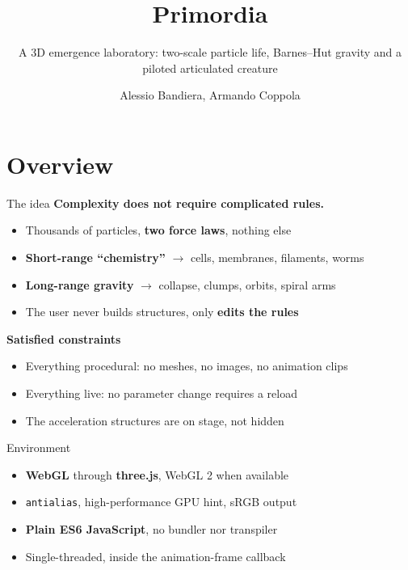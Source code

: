 \documentclass[10pt]{beamer}
\title{Primordia}
\subtitle{A 3D emergence laboratory: two-scale particle life, Barnes--Hut gravity
          and a piloted articulated creature}
\author{Alessio Bandiera, Armando Coppola}
\begin{document}
\maketitle

\section{Overview}

\begin{frame}{The idea}
	\textbf{Complexity does not require complicated rules.}
	\begin{itemize}
		\item Thousands of particles, \textbf{two force laws}, nothing else
		\item \textbf{Short-range ``chemistry''} $\to$ cells, membranes, filaments, worms
		\item \textbf{Long-range gravity} $\to$ collapse, clumps, orbits, spiral arms
		\item The user never builds structures, only \textbf{edits the rules}
	\end{itemize}
	\vspace{1ex}
	\textbf{Satisfied constraints}
	\begin{itemize}
		\item Everything procedural: no meshes, no images, no animation clips
		\item Everything live: no parameter change requires a reload
		\item The acceleration structures are on stage, not hidden
	\end{itemize}
\end{frame}

\begin{frame}{Environment}
	\begin{itemize}
		\item \textbf{WebGL} through \textbf{three.js}, WebGL 2 when available
		\item \texttt{antialias}, high-performance GPU hint, sRGB output
		\item \textbf{Plain ES6 JavaScript}, no bundler nor transpiler
		\item Single-threaded, inside the animation-frame callback
	\end{itemize}
\end{frame}
\end{document}
